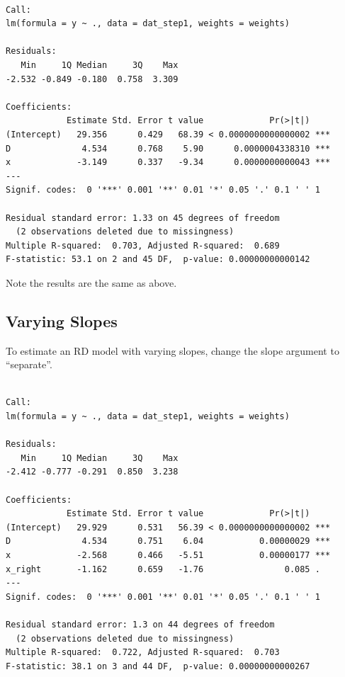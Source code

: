 \documentclass[]{book}
\newenvironment{Shaded}{\begin{snugshade}}{\end{snugshade}}
\newcommand{\DataTypeTok}[1]{\textcolor[rgb]{0.13,0.29,0.53}{#1}}
\newcommand{\DecValTok}[1]{\textcolor[rgb]{0.00,0.00,0.81}{#1}}
\newcommand{\KeywordTok}[1]{\textcolor[rgb]{0.13,0.29,0.53}{\textbf{#1}}}
\newcommand{\NormalTok}[1]{#1}
\newcommand{\OperatorTok}[1]{\textcolor[rgb]{0.81,0.36,0.00}{\textbf{#1}}}
\newcommand{\StringTok}[1]{\textcolor[rgb]{0.31,0.60,0.02}{#1}}
\begin{document}
\begin{verbatim}

Call:
lm(formula = y ~ ., data = dat_step1, weights = weights)

Residuals:
   Min     1Q Median     3Q    Max 
-2.532 -0.849 -0.180  0.758  3.309 

Coefficients:
            Estimate Std. Error t value             Pr(>|t|)    
(Intercept)   29.356      0.429   68.39 < 0.0000000000000002 ***
D              4.534      0.768    5.90      0.0000004338310 ***
x             -3.149      0.337   -9.34      0.0000000000043 ***
---
Signif. codes:  0 '***' 0.001 '**' 0.01 '*' 0.05 '.' 0.1 ' ' 1

Residual standard error: 1.33 on 45 degrees of freedom
  (2 observations deleted due to missingness)
Multiple R-squared:  0.703, Adjusted R-squared:  0.689 
F-statistic: 53.1 on 2 and 45 DF,  p-value: 0.00000000000142
\end{verbatim}

Note the results are the same as above.

\hypertarget{varying-slopes-1}{%
\subsection{Varying Slopes}\label{varying-slopes-1}}

To estimate an RD model with varying slopes, change the slope argument to ``separate''.

\begin{Shaded}
\end{Shaded}

\begin{verbatim}

Call:
lm(formula = y ~ ., data = dat_step1, weights = weights)

Residuals:
   Min     1Q Median     3Q    Max 
-2.412 -0.777 -0.291  0.850  3.238 

Coefficients:
            Estimate Std. Error t value             Pr(>|t|)    
(Intercept)   29.929      0.531   56.39 < 0.0000000000000002 ***
D              4.534      0.751    6.04           0.00000029 ***
x             -2.568      0.466   -5.51           0.00000177 ***
x_right       -1.162      0.659   -1.76                0.085 .  
---
Signif. codes:  0 '***' 0.001 '**' 0.01 '*' 0.05 '.' 0.1 ' ' 1

Residual standard error: 1.3 on 44 degrees of freedom
  (2 observations deleted due to missingness)
Multiple R-squared:  0.722, Adjusted R-squared:  0.703 
F-statistic: 38.1 on 3 and 44 DF,  p-value: 0.00000000000267
\end{verbatim}
\end{document}
